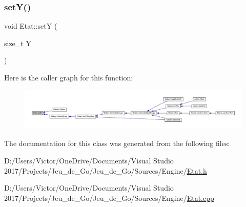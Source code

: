 \subsubsection{\texorpdfstring{set\+Y()}{setY()}}
{\footnotesize\ttfamily void Etat\+::setY (\begin{DoxyParamCaption}\item[{size\+\_\+t}]{Y }\end{DoxyParamCaption})}

Here is the caller graph for this function\+:
\nopagebreak
\begin{figure}[H]
\begin{center}
\leavevmode
\includegraphics[width=350pt]{class_etat_a8a54fc9ecb1b97d84d2f1f259e3bf70e_icgraph}
\end{center}
\end{figure}


The documentation for this class was generated from the following files\+:\begin{DoxyCompactItemize}
\item 
D\+:/\+Users/\+Victor/\+One\+Drive/\+Documents/\+Visual Studio 2017/\+Projects/\+Jeu\+\_\+de\+\_\+\+Go/\+Jeu\+\_\+de\+\_\+\+Go/\+Sources/\+Engine/\hyperlink{_etat_8h}{Etat.\+h}\item 
D\+:/\+Users/\+Victor/\+One\+Drive/\+Documents/\+Visual Studio 2017/\+Projects/\+Jeu\+\_\+de\+\_\+\+Go/\+Jeu\+\_\+de\+\_\+\+Go/\+Sources/\+Engine/\hyperlink{_etat_8cpp}{Etat.\+cpp}\end{DoxyCompactItemize}
